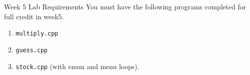 \documentclass[]{beamer}
\begin{document}
\begin{frame}{Week 5 Lab Requirements}
    You must have the following programs completed for full credit in
    week5.
    \begin{enumerate}
        \item \texttt{multiply.cpp}
        \item \texttt{guess.cpp}
        \item \texttt{stock.cpp} (with enum and menu loops).
    \end{enumerate}
\end{frame}
\end{document}
